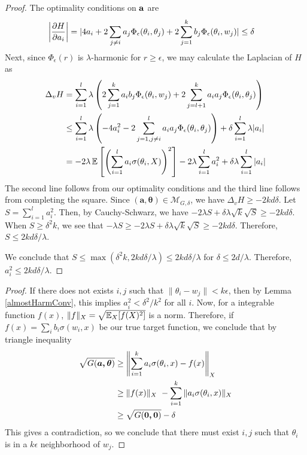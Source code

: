 \begin{proof}
The optimality conditions on ${\bf a}$ are 
\begin{align*}
   \left| \frac{\partial H}{\partial a_i} \right| & = \lvert 4a_i  + 2\sum_{j\neq i} a_j \Phi_\epsilon(\theta_i,\theta_j) + 2\sum_{j=1}^k b_j \Phi_\epsilon(\theta_i,w_j) \rvert \leq \delta
\end{align*}
%
Next, since $\Phi_\epsilon(r)$ is $\lambda$-harmonic for $r \geq \epsilon$, we may calculate the Laplacian of $H$ as
%
\begin{align*}
\Delta_v H & = \sum_{i=1}^l \lambda \left(2\sum_{j=1}^k a_ib_j
  \Phi_\epsilon(\theta_i, w_j) + 2\sum_{j=l+1}^k a_ia_j
  \Phi_\epsilon(\theta_i, \theta_j)\right) \\
& \leq \sum_{i=1}^l \lambda \left(-4 a_i^2 - 2
  \sum_{j = 1, j\neq i}^l  a_ia_j \Phi_\epsilon(\theta_i,\theta_j)\right)+ \delta \sum_{i=1}^l \lambda |a_i| \\
&= -2\lambda\operatorname*{\mathbb{E}}\left[\left( \sum_{i=1}^l a_i \sigma(\theta_i,X)\right)^2\right] -2\lambda \sum_{i=1}^l a_i^2+ \delta\lambda\sum_{i=1}^l  |a_i| \\
\end{align*} 
%
The second line follows from our optimality conditions and the third line follows from completing the square. Since $\boldsymbol{(a,\theta)} \in \mathcal{M}_{G,\delta}$, we have $\Delta_v H \geq - 2kd\delta$. Let $S = \sum_{i=1}^l a_i^2$. Then, by Cauchy-Schwarz, we have $-2 \lambda S + \delta\lambda\sqrt{k} \sqrt{S} \geq -2kd\delta$. When $S \geq \delta^2 k$, we see that $-\lambda S \geq -2 \lambda S + \delta\lambda \sqrt{k}\sqrt{S} \geq -2kd\delta$. Therefore, $S \leq 2kd\delta/\lambda$.
 
We conclude that $S \leq \max(\delta^2k, 2kd\delta/\lambda) \leq 2kd\delta/\lambda$ for $\delta\leq 2d/\lambda$. Therefore, $a_i^2 \leq 2kd\delta/\lambda$.

\end{proof}

\AlmostHarmRes*
 \begin{proof}
 If there does not exists $i, j$ such that
   $\|\theta_i - w_j\| <k\epsilon$, then by Lemma \ref{almostHarmConv}, this implies $a_i^2 < \delta^2/k^2$ for all $i$. Now, for a integrable
   function $f(x)$, $\| f\|_X = \sqrt{\operatorname*{\mathbb{E}}_X[f(X)^2]}$ is a
   norm. Therefore, if $f(x) = \sum_i b_i \sigma(w_i,x)$ be our true
   target function, we conclude that by triangle inequality
\begin{align*}
\sqrt{G(\boldsymbol{a,\theta})}  & \geq \left\lVert \sum_{i=1}^k a_i \sigma(\theta_i,x) - f(x) \right\rVert_X \\
&\geq \|f(x)\|_X\ - \sum_{i=1}^k \|a_i\sigma(\theta_i,x) \|_X \\
& \geq
  \sqrt{G(\boldsymbol{0,0})} - \delta
\end{align*}
This gives a contradiction, so we conclude that there must exist $i, j$ such that $\theta_i$ is in a $k\epsilon$ neighborhood of $w_j$.
 \end{proof}
 
